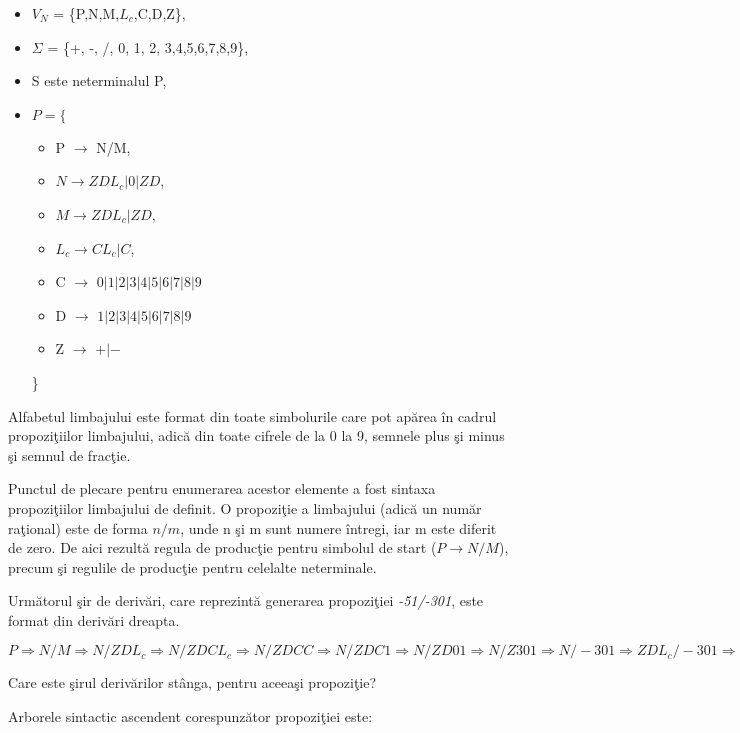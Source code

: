 \begin{itemize}
\item
$V_{N}$ = \{P,N,M,$L_c$,C,D,Z\},
\item
$\Sigma$ = \{+, -, /, 0, 1, 2, 3,4,5,6,7,8,9\},
\item
S este neterminalul P,
\item
$P = \{$
\begin{itemize}
\item
P $\rightarrow$  N/M,
\item
$N \rightarrow ZDL_c | 0 | ZD$,
\item
$M \rightarrow ZDL_c | ZD$,
\item
$L_c \rightarrow CL_c | C$,
\item
C $\rightarrow$ $0|1|2|3|4|5|6|7|8|9$
\item
D $\rightarrow$ $1|2|3|4|5|6|7|8|9$
\item
Z $\rightarrow$  $+|-$
\end{itemize}
\}
\end{itemize}

Alfabetul limbajului este format din toate simbolurile care pot apărea în cadrul propoziţiilor limbajului, adică din toate cifrele de la 0 la 9, semnele plus şi minus şi semnul de fracţie.

Punctul de plecare pentru enumerarea acestor elemente a fost sintaxa propoziţiilor limbajului de definit. O propoziţie a limbajului (adică un număr raţional) este de forma $n/m$, unde n şi m sunt numere întregi, iar m este diferit de zero. De aici rezultă regula de producţie pentru simbolul de start ($P \rightarrow  N/M$), precum şi regulile de producţie pentru celelalte neterminale.

Următorul şir de derivări, care reprezintă generarea propoziţiei \textit{-51/-301}, este format din derivări dreapta.

$ P \Rightarrow N/M  \Rightarrow N/ZDL_c  \Rightarrow N/ZDCL_c \Rightarrow N/ZDCC \Rightarrow N/ZDC1 \Rightarrow N/ZD01 \Rightarrow N/Z301 \Rightarrow  N/-301 \Rightarrow ZDL_c/-301 \Rightarrow ZDC/-301 \Rightarrow ZD1/-301 \Rightarrow Z51/-301 \Rightarrow -51/-301$

Care este şirul derivărilor stânga, pentru aceeaşi propoziţie?

Arborele sintactic ascendent corespunzător propoziţiei este:

